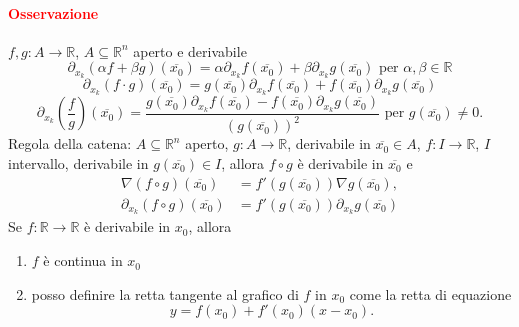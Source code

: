 \documentclass{article}
\newcommand{\R}{\mathbb{R}}
\begin{document}
\paragraph{\textcolor{red}{Osservazione}}
$f,g:A\rightarrow\R$, $A\subseteq\R^n$ aperto e derivabile
\begin{equation*}
    \partial_{x_k}(\alpha f+\beta g)(\overline{x_0})=\alpha\partial_{x_k}f(\overline{x_0})+\beta\partial_{x_k}g(\overline{x_0}) \text{  per  }   \alpha,\beta\in\R
\end{equation*}
\begin{equation*}
    \partial_{x_k}(f\cdot g)(\overline{x_0})=g(\overline{x_0})\partial_{x_k}f(\overline{x_0})+f(\overline{x_0})\partial_{x_k}g(\overline{x_0})
\end{equation*}
\begin{equation*}
    \partial_{x_k}\left(\frac{f}{g}\right)(\overline{x_0})=\frac{g(\overline{x_0})\partial_{x_k}f(\overline{x_0})-f(\overline{x_0})\partial_{x_k}g(\overline{x_0})}{(g(\overline{x_0}))^2} \text{  per  } g(\overline{x_0})\neq 0.
\end{equation*}
Regola della catena: $A\subseteq \R^n$ aperto, $g:A\rightarrow \R$, derivabile in $\overline{x_0}\in A$, $f:I\rightarrow\R$, $I$ intervallo, derivabile in $g(\overline{x_0})\in I$, allora $f\circ g$ è derivabile in $\overline{x_0}$ e 
\begin{align*}
    \nabla(f \circ g)(\overline{x_0})&=f'(g(\overline{x_0}))\nabla g(\overline{x_0}),\\
    \partial_{x_k}(f\circ g)(\overline{x_0})&=f'(g(\overline{x_0}))\partial_{x_k}g(\overline{x_0})
\end{align*}Se $f:\R\rightarrow\R$ è derivabile in $x_0$, allora
\begin{enumerate}
    \item $f$ è continua in $x_0$
    \item posso definire la retta tangente al grafico di $f$ in $x_0$ come la retta di equazione
    \begin{equation*}
        y=f(x_0)+f'(x_0)(x-x_0).
    \end{equation*}
\end{enumerate}
\end{document}
